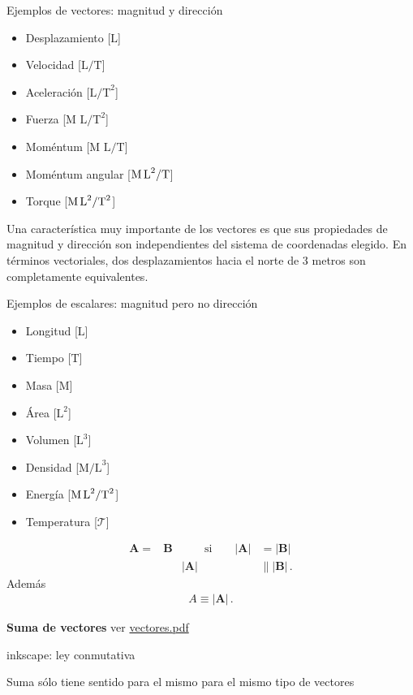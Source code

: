 Ejemplos de vectores: magnitud y direcci\'on
\begin{itemize}
\item Desplazamiento [$\text{L}$]
\item Velocidad [$\text{L/T}$] 
\item Aceleración [$\text{L/T}^2$]
\item Fuerza [$\text{M L/T}^2$]
\item Moméntum [$\text{M L/T}$]
\item Moméntum angular [$\text{M\,L}^2/\text{T}$]
\item Torque [$\text{M\,L}^2/\text{T}^2$]
\end{itemize}

Una característica muy importante de los vectores es que sus propiedades de magnitud y dirección son independientes del sistema de coordenadas elegido. En términos vectoriales, dos desplazamientos hacia el norte de 3 metros son completamente equivalentes. 



Ejemplos de escalares: magnitud pero no dirección
\begin{itemize}
\item Longitud [$\text{L}$]
\item Tiempo [$\text{T}$]
\item Masa [$\text{M}$]
\item Área [$\text{L}^2$]
\item Volumen [$\text{L}^3$]
\item Densidad [$\text{M/L}^3$]
\item Energía [$\text{M\,L}^2/\text{T}^2$]
\item Temperatura [$\mathcal{T}$]
\end{itemize}

\begin{align*}
  \mathbf{A}=&\mathbf{B} &\qquad \text{si}\qquad |\mathbf{A}|&=|\mathbf{B}|\nonumber\\
  &&|\mathbf{A}|&\parallel|\mathbf{B}|\,.
\end{align*}
Adem\'as
\begin{align}
  A\equiv|\mathbf{A}|\,.
\end{align}

\textbf{Suma de vectores}
ver \href{https://docs.google.com/viewer?a=v&pid=sites&srcid=ZmlzaWNhLnVkZWEuZWR1LmNvfG1lY2FuaWNhfGd4OjdmNWMyZTc5NDIxNTAxNjg}{vectores.pdf}
\begin{inprogress}
  inkscape: ley conmutativa
\end{inprogress}
Suma s\'olo tiene sentido para el mismo para el mismo tipo de vectores


